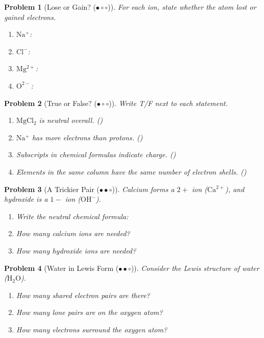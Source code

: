 \documentclass[a4paper,11pt]{article}
\newcommand{\easy}{(\ensuremath{\bullet \circ \circ})}
\newcommand{\medium}{(\ensuremath{\bullet \bullet \circ})}
\theoremstyle{listprobstyle}
\newtheorem{problem}{Problem}
\begin{document}
\begin{problem}[Lose or Gain? \easy]
For each ion, state whether the atom lost or gained electrons.
\vspace{-0.6\baselineskip}
\begin{enumerate}[label=\alph*),itemsep=0pt,parsep=0pt,topsep=0pt]
\item $\mathrm{Na^+}$: \underline{\phantom{XXXXXX}}
\item $\mathrm{Cl^-}$: \underline{\phantom{XXXXXX}}
\item $\mathrm{Mg^{2+}}$: \underline{\phantom{XXXXXX}}
\item $\mathrm{O^{2-}}$: \underline{\phantom{XXXXXX}}
\end{enumerate}
\end{problem}

\begin{problem}[True or False? \easy]
Write T/F next to each statement.
\vspace{-0.6\baselineskip}
\begin{enumerate}[label=\alph*),itemsep=0pt,parsep=0pt,topsep=0pt]
\item $\mathrm{MgCl_2}$ is neutral overall. (\phantom{X})
\item $\mathrm{Na^+}$ has more electrons than protons. (\phantom{X})
\item Subscripts in chemical formulas indicate charge. (\phantom{X})
\item Elements in the same column have the same number of electron
    shells. (\phantom{X})
\end{enumerate}
\end{problem}

\begin{problem}[A Trickier Pair \medium]
Calcium forms a $2+$ ion ($\mathrm{Ca^{2+}}$), and hydroxide is a
$1-$ ion ($\mathrm{OH^-}$).
\vspace{-0.6\baselineskip}
\begin{enumerate}[label=\alph*),itemsep=0pt,parsep=0pt,topsep=0pt]
\item Write the neutral chemical formula:
    \underline{\phantom{XXXXXXX}}
\item How many calcium ions are needed?
    \underline{\phantom{XXX}}
\item How many hydroxide ions are needed?
    \underline{\phantom{XXX}}
\end{enumerate}
\end{problem}

\begin{problem}[Water in Lewis Form \medium]
Consider the Lewis structure of water ($\mathrm{H_2O}$).
\vspace{-0.6\baselineskip}
\begin{enumerate}[label=\alph*),itemsep=0pt,parsep=0pt,topsep=0pt]
\item How many shared electron pairs are there?
    \underline{\phantom{XXXX}}
\item How many lone pairs are on the oxygen atom?
    \underline{\phantom{XXXX}}
\item How many electrons surround the oxygen atom?
    \underline{\phantom{XXXX}}
\end{enumerate}
\end{problem}
\end{document}
